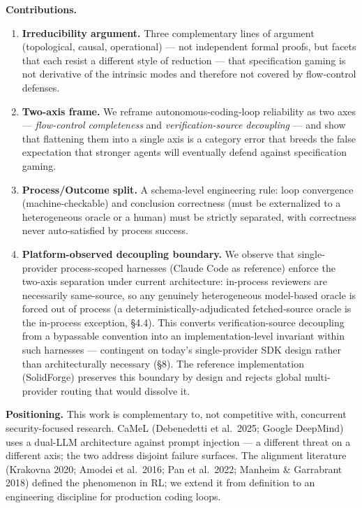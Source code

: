 \documentclass[
  11pt,
]{article}
\providecommand{\tightlist}{%
  \setlength{\itemsep}{0pt}\setlength{\parskip}{0pt}}
\begin{document}
\textbf{Contributions.}

\begin{enumerate}
\def\labelenumi{\arabic{enumi}.}
\tightlist
\item
  \textbf{Irreducibility argument.} Three complementary lines of
  argument (topological, causal, operational) --- not independent formal
  proofs, but facets that each resist a different style of reduction ---
  that specification gaming is not derivative of the intrinsic modes and
  therefore not covered by flow-control defenses.
\item
  \textbf{Two-axis frame.} We reframe autonomous-coding-loop reliability
  as two axes --- \emph{flow-control completeness} and
  \emph{verification-source decoupling} --- and show that flattening
  them into a single axis is a category error that breeds the false
  expectation that stronger agents will eventually defend against
  specification gaming.
\item
  \textbf{Process/Outcome split.} A schema-level engineering rule: loop
  convergence (machine-checkable) and conclusion correctness (must be
  externalized to a heterogeneous oracle or a human) must be strictly
  separated, with correctness never auto-satisfied by process success.
\item
  \textbf{Platform-observed decoupling boundary.} We observe that
  single-provider process-scoped harnesses (Claude Code as reference)
  enforce the two-axis separation under current architecture: in-process
  reviewers are necessarily same-source, so any genuinely heterogeneous
  model-based oracle is forced out of process (a
  deterministically-adjudicated fetched-source oracle is the in-process
  exception, §4.4). This converts verification-source decoupling from a
  bypassable convention into an implementation-level invariant within
  such harnesses --- contingent on today's single-provider SDK design
  rather than architecturally necessary (§8). The reference
  implementation (SolidForge) preserves this boundary by design and
  rejects global multi-provider routing that would dissolve it.
\end{enumerate}

\textbf{Positioning.} This work is complementary to, not competitive
with, concurrent security-focused research. CaMeL (Debenedetti et
al.~2025; Google DeepMind) uses a dual-LLM architecture against prompt
injection --- a different threat on a different axis; the two address
disjoint failure surfaces. The alignment literature (Krakovna 2020;
Amodei et al.~2016; Pan et al.~2022; Manheim \& Garrabrant 2018) defined
the phenomenon in RL; we extend it from definition to an engineering
discipline for production coding loops.
\end{document}
